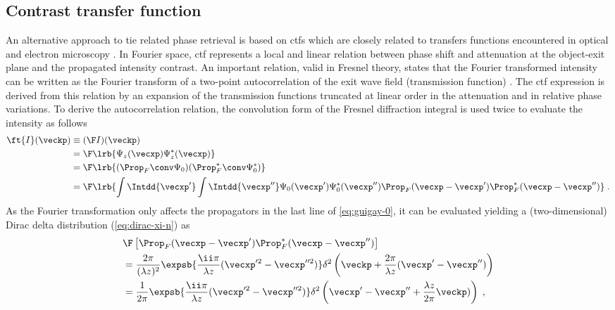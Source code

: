 \documentclass[
twoside,
openright,
titlepage,
numbers=noenddot,
headinclude,
fleqn,
a4paper,
footinclude=true,
cleardoublepage=empty,
abstractoff,
BCOR=5mm,
paper=a4,
fontsize=11pt,
british,ngerman,american,
]{scrreprt}
\begin{document}
\subsection{Contrast transfer function}
\label{sec:ctf}

An alternative approach to \ac{tie} related phase retrieval is based
on \acfp{ctf} which are closely related to transfers functions
encountered in optical and electron microscopy
\cite{Streibl1985,Kirkland1998}.  In Fourier space, \ac{ctf}
represents a local and linear relation between phase shift and
attenuation at the object-exit plane and the propagated intensity
contrast.  An important relation, valid in Fresnel theory, states that
the Fourier transformed intensity can be written as the Fourier
transform of a two-point autocorrelation of the exit wave field
(transmission function) \cite{Guigay1977,Guigay1978,Papoulis1974}.
The \ac{ctf} expression is derived from this relation by an expansion
of the transmission functions truncated at linear order in the
attenuation and in relative phase variations.  To derive the
autocorrelation relation, the convolution form of the Fresnel
diffraction integral is used twice to evaluate the intensity as
follows
\begin{equation}
  \label{eq:guigay-0}
  \begin{split}
    \ft{I}(\veckp) & \equiv (\F I)(\veckp) 
    \\ &= \F\lrb{ \Psi_z(\vecxp) \Psi_z^*(\vecxp) } 
    \\ &=\F\lrb{ (\Prop_F\conv\Psi_0)(\Prop^*_F\conv\Psi_0^*) } 
    \\ &=\F\lrb{\int\Intdd{\vecxp'}\int\Intdd{\vecxp''}
      \Psi_0(\vecxp')\Psi_0^*(\vecxp'')
      \Prop_F(\vecxp-\vecxp')\Prop^*_F(\vecxp-\vecxp'') } \;.
  \end{split}
\end{equation}
As the Fourier transformation only affects the propagators in the last
line of \cref{eq:guigay-0}, it can be evaluated yielding a
(two-dimensional) Dirac delta distribution (\cref{eq:dirac-xi-n}) as
\begin{equation}
  \label{eq:fourier-propagator}
  \begin{split}
    &\F\left[\Prop_F(\vecxp-\vecxp')\Prop^*_F(\vecxp-\vecxp'') \right]
    \\ &= \frac{2\pi}{(\lambda z)^2} 
    \expsb{\frac{\ii\pi}{\lambda z}(\vecxp'^2-\vecxp''^2)}
    \delta^2\left(\veckp
      +\frac{2\pi}{\lambda z}(\vecxp'-\vecxp'')\right)
    \\ &=\frac{1}{2\pi} \expsb{\frac{\ii\pi}{\lambda z}
      (\vecxp'^2-\vecxp''^2)}
    \delta^2\left(\vecxp' -\vecxp'' 
      + \frac{\lambda z}{2\pi}\veckp)\right) \;,
  \end{split}
\end{equation}
\end{document}

